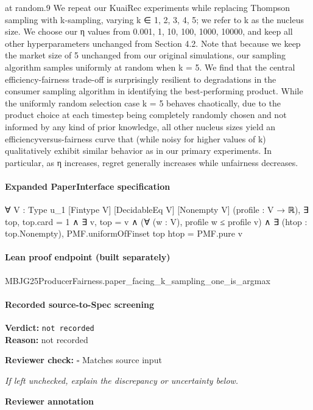 \documentclass[10pt]{article}
\newcommand{\reviewerbox}{%
  \par\noindent\fbox{\parbox{0.96\linewidth}{\rule{0pt}{0.38in}}}\par
}
\newcommand{\reviewmatch}[1]{%
  \par\noindent\textbf{Reviewer check:} $\square$\; #1\par
  \noindent\emph{If left unchecked, explain the discrepancy or uncertainty below.}\par
}
\begin{document}
\begin{ReviewVerbatim}
at random.9
We repeat our KuaiRec experiments while replacing Thompson sampling with k-sampling, varying k ∈
{1, 2, 3, 4, 5}; we refer to k as the nucleus size. We choose
our η values from {0.001, 1, 10, 100, 1000, 10000}, and
keep all other hyperparameters unchanged from Section 4.2.
Note that because we keep the market size of 5 unchanged
from our original simulations, our sampling algorithm samples uniformly at random when k = 5.
We find that the central efficiency-fairness trade-off is surprisingly resilient to degradations in the consumer sampling
algorithm in identifying the best-performing product. While
the uniformly random selection case k = 5 behaves chaotically, due to the product choice at each timestep being completely randomly chosen and not informed by any kind of
prior knowledge, all other nucleus sizes yield an efficiencyversus-fairness curve that (while noisy for higher values of
k) qualitatively exhibit similar behavior as in our primary
experiments. In particular, as η increases, regret generally
increases while unfairness decreases.
\end{ReviewVerbatim}


\paragraph{Expanded PaperInterface specification}
\begin{ReviewVerbatim}
∀ {V : Type u_1} [Fintype V] [DecidableEq V] [Nonempty V] (profile : V → ℝ),
  ∃ top,
    top.card = 1 ∧
      ∃ v,
        top = {v} ∧
          (∀ (w : V), profile w ≤ profile v) ∧ ∃ (htop : top.Nonempty), PMF.uniformOfFinset top htop = PMF.pure v
\end{ReviewVerbatim}

\paragraph{Lean proof endpoint (built separately)}\begin{ReviewVerbatim}
MBJG25ProducerFairness.paper_facing_k_sampling_one_is_argmax
\end{ReviewVerbatim}

\paragraph{Recorded source-to-Spec screening}
\textbf{Verdict:} \texttt{not recorded}
\\
\textbf{Reason:} not recorded
\reviewmatch{Matches source input}
\noindent\textbf{Reviewer annotation}\par
\reviewerbox
\clearpage
\hypertarget{source-claim-48e4400514808bc7}{}
\end{document}
